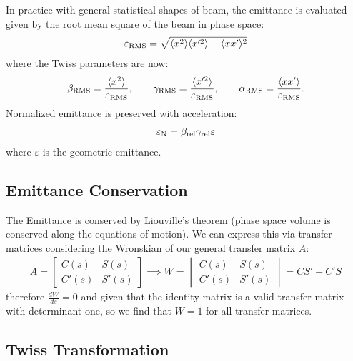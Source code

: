 \documentclass{article}
\numberwithin{equation}{section}
\begin{document}
In practice with general statistical shapes of beam, the emittance is evaluated given by the root mean square of the beam in phase space:
\begin{align}
\varepsilon_{\rm RMS} = \sqrt{\langle x^2 \rangle \langle x'^2 \rangle- \langle xx' \rangle^2}
\end{align}
where the Twiss parameters are now:
\begin{align}
\beta_{\rm RMS} = \frac{\langle x^2 \rangle}{\varepsilon_{\rm RMS}}, \qquad
\gamma_{\rm RMS} = \frac{\langle x'^2 \rangle}{\varepsilon_{\rm RMS}}, \qquad
\alpha_{\rm RMS} = \frac{\langle x x' \rangle}{\varepsilon_{\rm RMS}}.
\end{align}
Normalized emittance is preserved with acceleration:
\begin{align}
\varepsilon_{\rm N} = \beta_{\rm rel} \gamma_{\rm rel} \varepsilon
\end{align}
where $\varepsilon$ is the geometric emittance.

\subsection{Emittance Conservation}

The Emittance is conserved by Liouville's theorem (phase space volume is conserved along the equations of motion). We can express this via transfer matrices considering the Wronskian of our general transfer matrix $A$:
\begin{align}
A = \begin{bmatrix} C(s) & S(s) \\ C'(s) & S'(s)\end{bmatrix} \implies 
W = \begin{vmatrix} C(s) & S(s) \\ C'(s) & S'(s)\end{vmatrix} = CS'-C'S 
\end{align}
therefore $\frac{dW}{ds} = 0$ and given that the identity matrix is a valid transfer matrix with determinant one, so we find that $W=1$ for all transfer matrices.

\subsection{ Twiss Transformation }
\end{document}
